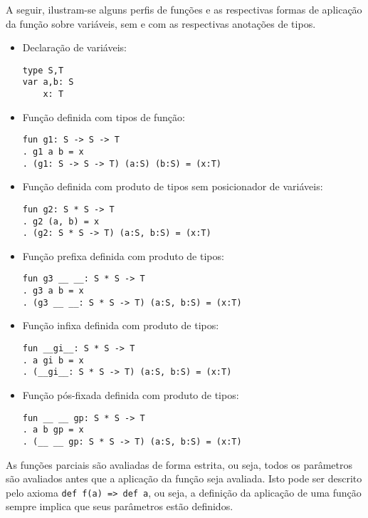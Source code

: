 A seguir, ilustram-se alguns perfis de funções e as respectivas formas de aplicação da função sobre variáveis, sem e com as respectivas anotações de tipos.
\begin{itemize}

\item Declaração de variáveis:
\begin{Verbatim}
type S,T
var a,b: S
    x: T
\end{Verbatim}

\item Função definida com tipos de função:
\begin{Verbatim}
fun g1: S -> S -> T
. g1 a b = x
. (g1: S -> S -> T) (a:S) (b:S) = (x:T)
\end{Verbatim}

\item Função definida com produto de tipos sem posicionador de variáveis:
\begin{Verbatim}
fun g2: S * S -> T
. g2 (a, b) = x
. (g2: S * S -> T) (a:S, b:S) = (x:T)
\end{Verbatim}

\item Função prefixa definida com produto de tipos:
\begin{Verbatim}
fun g3 __ __: S * S -> T
. g3 a b = x
. (g3 __ __: S * S -> T) (a:S, b:S) = (x:T)
\end{Verbatim}

\item Função infixa definida com produto de tipos:
\begin{Verbatim}
fun __gi__: S * S -> T
. a gi b = x
. (__gi__: S * S -> T) (a:S, b:S) = (x:T)
\end{Verbatim}

\item Função pós-fixada definida com produto de tipos:
\begin{Verbatim}
fun __ __ gp: S * S -> T
. a b gp = x
. (__ __ gp: S * S -> T) (a:S, b:S) = (x:T)
\end{Verbatim}

\end{itemize}

As funções parciais são avaliadas de forma estrita, ou seja, todos os parâmetros são avaliados antes que a aplicação da função seja avaliada.
Isto pode ser descrito pelo axioma \Verb.def f(a) => def a., ou seja, a definição da aplicação de uma função sempre implica que seus parâmetros estão definidos.

